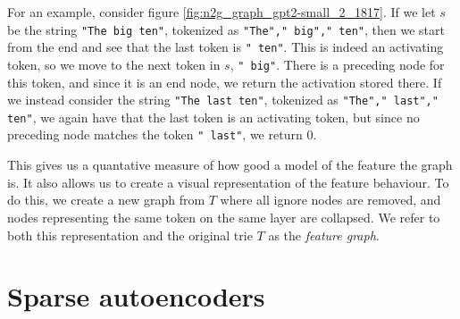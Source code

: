 For an example, consider figure \ref{fig:n2g_graph_gpt2-small_2_1817}.
If we let $s$ be the string \texttt{"The big ten"}, tokenized as \texttt{"The"," big"," ten"}, then we start from the end and see that the last token is \texttt{" ten"}.
This is indeed an activating token, so we move to the next token in $s$, \texttt{" big"}.
There is a preceding node for this token, and since it is an end node, we return the activation stored there.
If we instead consider the string \texttt{"The last ten"}, tokenized as \texttt{"The"," last"," ten"}, we again have that the last token is an activating token, but since no preceding node matches the token \texttt{" last"}, we return $0$.

This gives us a quantative measure of how good a model of the feature 
the graph is.
It also allows us to create a visual representation 
of the feature behaviour.
To do this, we create a new graph from $T$ 
where all ignore nodes are removed, 
and nodes representing the same token on the same layer are collapsed.
We refer to both this representation and the original trie $T$ 
as the \emph{feature graph}.


\section{Sparse autoencoders}
\label{sec:sae}
